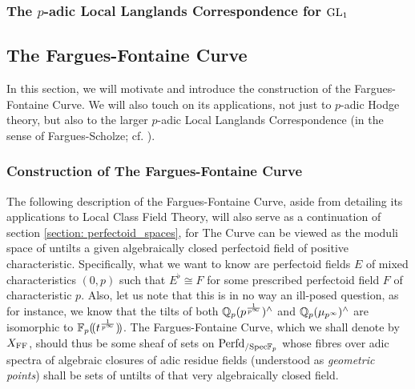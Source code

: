             \subsubsection{The \texorpdfstring{$p$}{}-adic Local Langlands Correspondence for \texorpdfstring{$\operatorname{GL}_1$}{}}
        
        \subsection{The Fargues-Fontaine Curve} \label{section: the_fargues_fontaine_curve}
            In this section, we will motivate and introduce the construction of the Fargues-Fontaine Curve. We will also touch on its applications, not just to $p$-adic Hodge theory, but also to the larger $p$-adic Local Langlands Correspondence (in the sense of Fargues-Scholze; cf. \cite{fargues_scholze_geometrization_of_local_langlands}).
        
            \subsubsection{Construction of The Fargues-Fontaine Curve}
                The following description of the Fargues-Fontaine Curve, aside from detailing its applications to Local Class Field Theory, will also serve as a continuation of section \ref{section: perfectoid_spaces}, for The Curve can be viewed as the moduli space of untilts a given algebraically closed perfectoid field of positive characteristic. Specifically, what we want to know are perfectoid fields $E$ of mixed characteristics $(0, p)$ such that $E^{\flat} \cong F$ for some prescribed perfectoid field $F$ of characteristic $p$. Also, let us note that this is in no way an ill-posed question, as for instance, we know that the tilts of both $\mathbb{Q}_p(p^{\frac{1}{p^{\infty}}})^{\wedge}$ and $\mathbb{Q}_p(\mu_{p^{\infty}})^{\wedge}$ are isomorphic to $\mathbb{F}_p(\!(t^{\frac{1}{p^{\infty}}})\!)$. The Fargues-Fontaine Curve, which we shall denote by $X_{\mathrm{FF}}$, should thus be some sheaf of sets on $\mathrm{Perfd}_{/\mathrm{Spec} \mathbb{F}_p}$ whose fibres over adic spectra of algebraic closures of adic residue fields (understood as \textit{geometric points}) shall be sets of untilts of that very algebraically closed field.
                
